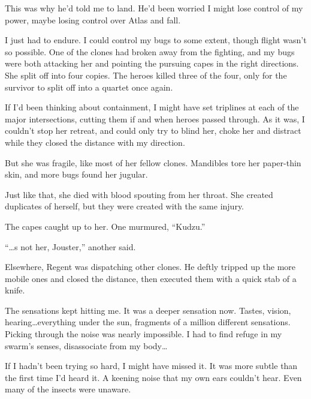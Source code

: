 This was why he'd told me to land.  He'd been worried I might lose control of my power, maybe losing control over Atlas and fall.



I just had to endure.  I could control my bugs to some extent, though flight wasn't so possible.  One of the clones had broken away from the fighting, and my bugs were both attacking her and pointing the pursuing capes in the right directions.  She split off into four copies.  The heroes killed three of the four, only for the survivor to split off into a quartet once again.



If I'd been thinking about containment, I might have set triplines at each of the major intersections, cutting them if and when heroes passed through.  As it was, I couldn't stop her retreat, and could only try to blind her, choke her and distract while they closed the distance with my direction.



But she was fragile, like most of her fellow clones.  Mandibles tore her paper-thin skin, and more bugs found her jugular.



Just like that, she died with blood spouting from her throat.  She created duplicates of herself, but they were created with the same injury.



The capes caught up to her.  One murmured, ``Kudzu.''



``\ldots{}s not her, Jouster,'' another said.



Elsewhere, Regent was dispatching other clones.  He deftly tripped up the more mobile ones and closed the distance, then executed them with a quick stab of a knife.



The sensations kept hitting me.  It was a deeper sensation now.  Tastes, vision, hearing\ldots everything under the sun, fragments of a million different sensations.  Picking through the noise was nearly impossible.  I had to find refuge in my swarm's senses, disassociate from my body\ldots



If I hadn't been trying so hard, I might have missed it.  It was more subtle than the first time I'd heard it.  A keening noise that my own ears couldn't hear.  Even many of the insects were unaware.



